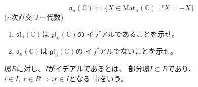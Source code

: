 \documentclass[12pt,b5paper]{ltjsarticle}
\begin{document}
\begin{equation}
 \mathfrak{o}_{n}(\mathbb{C}) :=
  \{ X\in \mathrm{Mat}_{n}(\mathbb{C}) \mid {}^{t}{X}=-X \}
\end{equation}
($n$次直交リー代数)

\begin{enumerate}
 \item
      $\mathfrak{sl}_{n} (\mathbb{C})$は
      $\mathfrak{gl}_{n} (\mathbb{C})$の
      イデアルであることを示せ。

 \item
      $\mathfrak{o}_{n} (\mathbb{C})$は
      $\mathfrak{gl}_{n} (\mathbb{C})$の
      イデアルでないことを示せ。

\end{enumerate}

\dotfill

環$R$に対し、$I$がイデアルであるとは、
部分環$I\subset R$であり、
$i\in I,\; r\in R \Rightarrow ir \in I$となる
事をいう。
\end{document}
